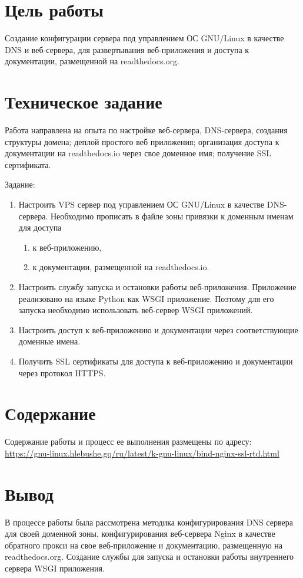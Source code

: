 \documentclass[12pt,a4paper]{article}
\begin{document}
\makeqtitle
\setcounter{page}{2}

\section{Цель работы}

Создание конфигурации сервера под управлением ОС GNU/Linux в качестве
DNS и веб-сервера, для развертывания веб-приложения и доступа к документации,
размещенной на readthedocs.org.

\section{Техническое задание}

Работа направлена на опыта по настройке веб-сервера, DNS-сервера, создания структуры домена;
деплой простого веб приложения; организация доступа к документации на readthedocs.io через
свое доменное имя; получение SSL сертификата.

Задание:

\begin{enumerate}
    \item Настроить VPS сервер под управлением ОС GNU/Linux в качестве DNS-сервера.
          Необходимо прописать в файле зоны привязки к доменным именам для доступа
        \begin{enumerate}
            \item к веб-приложению,
            \item к документации, размещенной на readthedocs.io.
        \end{enumerate}
    \item Настроить службу запуска и остановки работы веб-приложения.
          Приложение реализовано на языке Python как WSGI приложение. Поэтому для его запуска
          необходимо использовать веб-сервер WSGI приложений.
    \item Настроить доступ к веб-приложению и документации через соответствующие доменные имена.
    \item Получить SSL сертификаты для доступа к веб-приложению и документации через протокол HTTPS.
\end{enumerate}

\section{Содержание}

Содержание работы и процесс ее выполнения размещены по адресу: \\
\url{https://gnu-linux.hlebushe.gq/ru/latest/k-gnu-linux/bind-nginx-ssl-rtd.html}

\section{Вывод}

В процессе работы была рассмотрена методика конфигурирования
DNS сервера для своей доменной зоны, конфигурирования веб-сервера Nginx в
качестве обратного прокси на свое веб-приложение и документацию, размещенную
на readthedocs.org. Создание службы для запуска и остановки работы
внутреннего сервера WSGI приложения.
\end{document}
